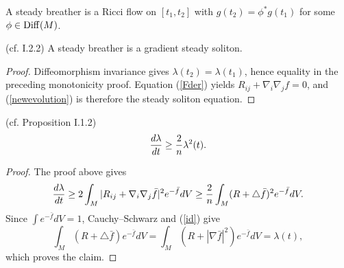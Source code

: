 \begin{definition}
  \label{def:kl-invariant-its-applications-steady-breather-definition}
A steady breather is a Ricci flow on $[t_1,t_2]$ with
$g(t_2)=\phi^*g(t_1)$ for some $\phi\in\operatorname{Diff}(M)$.
\end{definition}

\begin{proposition}
  \label{prop:kl-invariant-its-applications-rigidity-steady-breathers}
  (cf. I.2.2) \label{steadybreather}
A steady breather is a gradient steady soliton.
\end{proposition}
\begin{proof}
\sketch
Diffeomorphism invariance gives $\lambda(t_2)=\lambda(t_1)$, hence equality in
the preceding monotonicity proof. Equation (\ref{Fder}) yields
$R_{ij}+\nabla_i\nabla_jf=0$, and (\ref{newevolution}) is therefore the steady
soliton equation.
\end{proof}

\begin{lemma}
  \label{lem:kl-invariant-its-applications-differential-inequality-entropy}
  (cf. Proposition I.1.2) \label{2/3}
\begin{equation}
{d\lambda\over dt}\ge {2\over n}\lambda^2(t).
\end{equation}
\end{lemma}
\begin{proof}
\sketch
The proof above gives
\begin{equation}\label{dlambdadt}
{d\lambda\over dt}\ge2\int_M|R_{ij}+\nabla_i\nabla_j\bar f|^2e^{-\bar f}dV
\ge {2\over n}\int_M(R+\triangle\bar f)^2e^{-\bar f}dV.
\end{equation}
Since $\int e^{-\bar f}dV=1$, Cauchy--Schwarz and (\ref{id}) give
\begin{equation}\label{using}
\int_M(R+\triangle\bar f)e^{-\bar f}dV
=\int_M(R+|\nabla\bar f|^2)e^{-\bar f}dV=\lambda(t),
\end{equation}
which proves the claim.
\end{proof}

